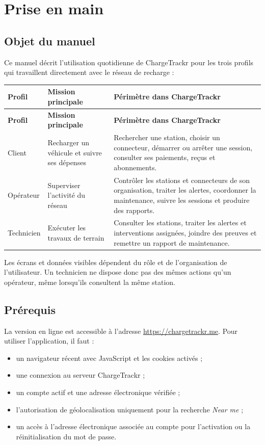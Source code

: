 \chapter{Prise en main}

\section{Objet du manuel}

Ce manuel décrit l'utilisation quotidienne de ChargeTrackr pour les trois profils
qui travaillent directement avec le réseau de recharge :

\begin{longtable}{|L{3.2cm}|L{5.1cm}|L{7.1cm}|}
  \hline
  \textbf{Profil} & \textbf{Mission principale} & \textbf{Périmètre dans ChargeTrackr} \\ \hline
  \endfirsthead
  \hline
  \textbf{Profil} & \textbf{Mission principale} & \textbf{Périmètre dans ChargeTrackr} \\ \hline
  \endhead
  Client & Recharger un véhicule et suivre ses dépenses &
  Rechercher une station, choisir un connecteur, démarrer ou arrêter une session,
  consulter ses paiements, reçus et abonnements. \\ \hline
  Opérateur & Superviser l'activité du réseau &
  Contrôler les stations et connecteurs de son organisation, traiter les alertes,
  coordonner la maintenance, suivre les sessions et produire des rapports. \\ \hline
  Technicien & Exécuter les travaux de terrain &
  Consulter les stations, traiter les alertes et interventions assignées, joindre
  des preuves et remettre un rapport de maintenance. \\ \hline
\end{longtable}

Les écrans et données visibles dépendent du rôle et de l'organisation de
l'utilisateur. Un technicien ne dispose donc pas des mêmes actions qu'un
opérateur, même lorsqu'ils consultent la même station.

\section{Prérequis}

La version en ligne est accessible à l'adresse
\url{https://chargetrackr.me}. Pour utiliser l'application, il faut :

\begin{itemize}[leftmargin=1.6em]
  \item un navigateur récent avec JavaScript et les cookies activés ;
  \item une connexion au serveur ChargeTrackr ;
  \item un compte actif et une adresse électronique vérifiée ;
  \item l'autorisation de géolocalisation uniquement pour la recherche
  \emph{Near me} ;
  \item un accès à l'adresse électronique associée au compte pour l'activation
  ou la réinitialisation du mot de passe.
\end{itemize}

